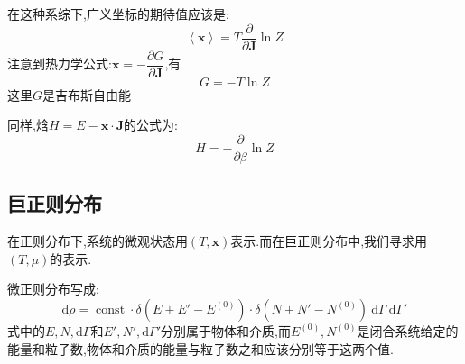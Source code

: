  在这种系综下,广义坐标的期待值应该是:
  \begin{equation}
    \left< \mathbf{x} \right> =T\dfrac{\partial }{\partial \mathbf{J}}\ln Z
  \end{equation}
  注意到热力学公式:$\mathbf{x}=-\dfrac{\partial G}{\partial \mathbf{J}}$,有
  \begin{equation}
    G=-T \ln Z
  \end{equation}
  这里$G$是吉布斯自由能
  
  同样,焓$H=E-\mathbf{x}\cdot \mathbf{J}$的公式为:
  \begin{equation}
    H=-\dfrac{\partial }{\partial \beta}\ln Z
  \end{equation}


\subsection{巨正则分布}
在正则分布下,系统的微观状态用$(T,\mathbf{x})$表示.而在巨正则分布中,我们寻求用$(T,\mu)$的表示.

微正则分布写成:
\begin{equation}
    \mathrm{d} \rho = \operatorname{const} \cdot \delta(E+E'-E^{(0)})\cdot \delta(N+N'-N^{(0)})~\mathrm{d} \Gamma ~\mathrm{d} \Gamma'
\end{equation}
式中的$E,N,\mathrm{d} \Gamma$和$E',N',\mathrm{d} \Gamma'$分别属于物体和介质,而$E^{(0)},N^{(0)}$是闭合系统给定的能量和粒子数,物体和介质的能量与粒子数之和应该分别等于这两个值.


